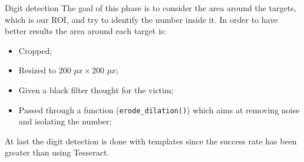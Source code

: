 \begin{frame}[fragile]{Digit detection}
The goal of this phase is to consider the area around the targets, which is our ROI, and try to identify the number inside it. \newline
In order to have better results the area around each target is:
\begin{itemize}
	\item Cropped;
	\item Resized to $200$ $px\times 200$ $px$;
	\item Given a black filter thought for the victim;
	\item Passed through a function (\texttt{erode_dilation()}) which aims at removing noise and isolating the number;
\end{itemize}
At last the digit detection is done with templates since the success rate has been greater than using Tesseract.
\end{frame}

